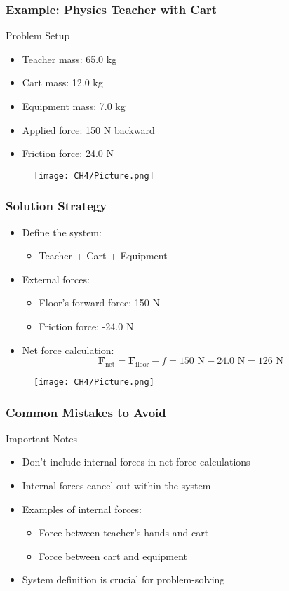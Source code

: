 \documentclass{beamer}
\begin{document}
\begin{frame}
\frametitle{Example: Physics Teacher with Cart}
\begin{block}{Problem Setup}
\begin{itemize}
    \item Teacher mass: 65.0 kg
    \item Cart mass: 12.0 kg
    \item Equipment mass: 7.0 kg
    \item Applied force: 150 N backward
    \item Friction force: 24.0 N
\end{itemize}
\end{block}
\begin{figure}[H]
    \centering
    \texttt{[image: CH4/Picture.png]}
\end{figure}

\end{frame}

\begin{frame}
\frametitle{Solution Strategy}
\begin{itemize}
    \item Define the system:
    \begin{itemize}
        \item Teacher + Cart + Equipment
    \end{itemize}
    \item External forces:
    \begin{itemize}
        \item Floor's forward force: 150 N
        \item Friction force: -24.0 N
    \end{itemize}
    \item Net force calculation:
    \[\mathbf{F}_{\text{net}} = \mathbf{F}_{\text{floor}} - f = 150\text{ N} - 24.0\text{ N} = 126\text{ N}\]
\end{itemize}
\begin{figure}
    \centering
    \texttt{[image: CH4/Picture.png]}
\end{figure}
\end{frame}

\begin{frame}
\frametitle{Common Mistakes to Avoid}
\begin{alertblock}{Important Notes}
\begin{itemize}
    \item Don't include internal forces in net force calculations
    \item Internal forces cancel out within the system
    \item Examples of internal forces:
    \begin{itemize}
        \item Force between teacher's hands and cart
        \item Force between cart and equipment
    \end{itemize}
    \item System definition is crucial for problem-solving
\end{itemize}
\end{alertblock}
\end{frame}
\end{document}
